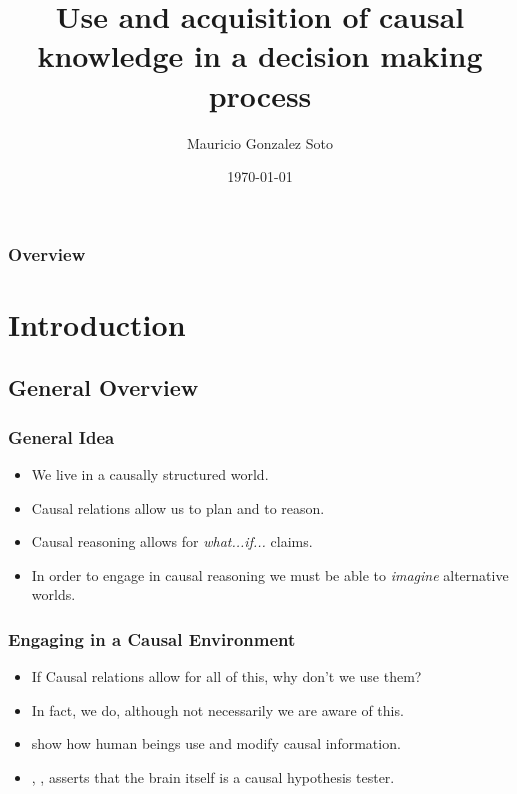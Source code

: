 \documentclass{beamer}
\title[Short title]{Use and acquisition of causal knowledge in a decision making process} %
\author{Mauricio Gonzalez Soto} %
\institute[INAOE] %
{
Instituto Nacional de Astrofísica Óptica y Electrónica \\ %
\medskip
\textit{mauricio@inaoep.mx} %
}
\date{\today} %
\theoremstyle{plain}
\begin{document}
\begin{frame}
\titlepage %
\end{frame}

\begin{frame}[allowframebreaks]
\frametitle{Overview} %
\tableofcontents %
\end{frame}


\section{Introduction}
\subsection{General Overview}
\begin{frame}
\frametitle{General Idea}
\begin{itemize}
\item We live in a causally structured world. 
\item Causal relations allow us to plan and to reason.
\item Causal reasoning allows for \textit{what...if...} claims.
\item In order to engage in causal reasoning we must be able to \textit{imagine} alternative worlds. 
\end{itemize}
\end{frame}

\begin{frame}
\frametitle{Engaging in a Causal Environment}
\begin{itemize}
\item If Causal relations allow for all of this, why don't we use them?
\item In fact, we do, although not necessarily we are aware of this. 
\item \cite{hagmayer2013repeated} show how human beings use and modify causal information.
\item \cite{hohwy2013predictive}, \cite{clark2015surfing}, asserts that the brain itself is a causal hypothesis tester. 
\end{itemize}
\end{frame}
\end{document}

